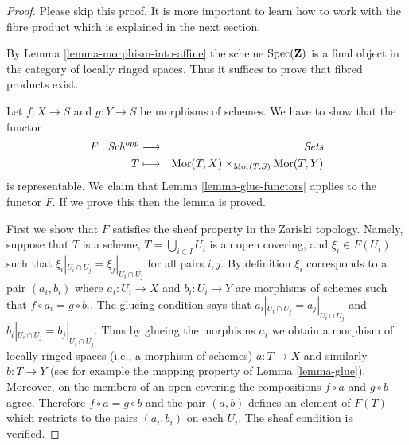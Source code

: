 \begin{proof}
Please skip this proof. It is more important to learn
how to work with the fibre product which is explained in
the next section.

\medskip\noindent
By Lemma \ref{lemma-morphism-into-affine}
the scheme $\mathop{\mathrm{Spec}}(\mathbf{Z})$ is a final
object in the category of locally ringed spaces. Thus it
suffices to prove that fibred products exist.

\medskip\noindent
Let $f : X \to S$ and $g : Y \to S$ be morphisms of schemes. We have to show
that the functor
\begin{eqnarray*}
F : \mathit{Sch}^{opp} & \longrightarrow & \textit{Sets} \\
T & \longmapsto &
\mathop{\mathrm{Mor}}\nolimits(T, X) \times_{\mathop{\mathrm{Mor}}\nolimits(T, S)} \mathop{\mathrm{Mor}}\nolimits(T, Y)
\end{eqnarray*}
is representable. We claim that Lemma \ref{lemma-glue-functors}
applies to the functor $F$. If we prove this then the lemma is proved.

\medskip\noindent
First we show that $F$ satisfies the sheaf property in the
Zariski topology. Namely, suppose that $T$ is a scheme,
$T = \bigcup_{i \in I} U_i$ is an open covering, and
$\xi_i \in F(U_i)$ such that
$\xi_i|_{U_i \cap U_j} =  \xi_j|_{U_i \cap U_j}$ for
all pairs $i, j$. By definition $\xi_i$ corresponds to
a pair $(a_i, b_i)$ where $a_i : U_i \to X$ and $b_i : U_i \to Y$
are morphisms of schemes such that $f \circ a_i = g \circ b_i$.
The glueing condition says that
$a_i|_{U_i \cap U_j} =  a_j|_{U_i \cap U_j}$
and
$b_i|_{U_i \cap U_j} =  b_j|_{U_i \cap U_j}$.
Thus by glueing the morphisms $a_i$ we obtain a morphism
of locally ringed spaces (i.e., a morphism of schemes)
$a : T \to X$ and similarly $b : T \to Y$ (see for example
the mapping property of Lemma \ref{lemma-glue}). Moreover,
on the members of an open covering the compositions
$f \circ a$ and $g \circ b$ agree. Therefore
$f \circ a = g \circ b$ and the pair $(a, b)$ defines
an element of $F(T)$ which restricts to the pairs
$(a_i, b_i)$ on each $U_i$. The sheaf condition is verified.


\end{proof}
